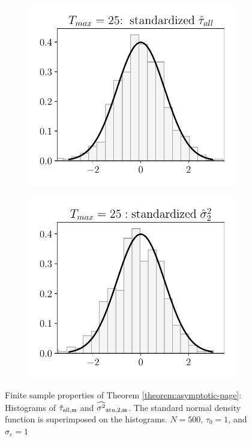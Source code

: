 \begin{figure}[h!]
\begin{subfigure}{0.3\textwidth}
	\end{subfigure}
	\begin{subfigure}{0.3\textwidth}
		\centering
		\includegraphics[width=1\linewidth]{plots/simulation/tau_T_25_adaptive.pdf}
	\end{subfigure}%
	\begin{subfigure}{0.3\textwidth}
		\centering
		\includegraphics[width=1\linewidth]{plots/simulation/sigma_2_T_25_adaptive.pdf}
	\end{subfigure}
	\caption{Finite sample properties of Theorem  \ref{theorem:asymptotic-page}: Histograms of $\hat{\tau}_{\mathrm{all},\mathsf{ss}}$ and $\widehat{\sigma^2}_{\mathrm{atu},2,\mathsf{ss}}$.  The standard normal density function is superimposed on the histograms. $N = 500$, $\tau_0 = 1$, and $\sigma_\varepsilon=1$}
	\label{fig:test-asymptotics-page}
\end{figure}



